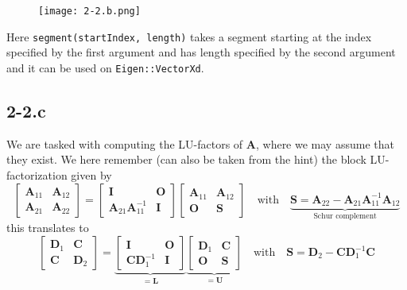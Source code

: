 \documentclass{article}
\begin{document}
\begin{figure}[!hbt]
    \centering
\texttt{[image: 2-2.b.png]}
\end{figure}

\noindent Here \verb|segment(startIndex, length)| takes a segment starting at the index specified by the first argument and has length specified by the second argument and it can be used on \verb|Eigen::VectorXd|.

\subsection*{2-2.c}
We are tasked with computing the LU-factors of $\mathbf{A}$, where we may assume that they exist. We here remember (can also be taken from the hint) the block LU-factorization given by
\begin{equation*}
    \begin{bmatrix}
        \mathbf{A}_{11} & \mathbf{A}_{12} \\
        \mathbf{A}_{21} & 
        \mathbf{A}_{22}
    \end{bmatrix}
    = \begin{bmatrix}
        \mathbf{I} & \mathbf{O} \\
        \mathbf{A}_{21}\mathbf{A}_{11}^{-1} & \mathbf{I}
    \end{bmatrix}
    \begin{bmatrix}
        \mathbf{A}_{11} & \mathbf{A}_{12} \\
        \mathbf{O} & \mathbf{S}
    \end{bmatrix}
    \quad \text{with} \quad \underbrace{\mathbf{S} = \mathbf{A}_{22}-\mathbf{A}_{21}\mathbf{A}_{11}^{-1}\mathbf{A}_{12}}_{\text{Schur complement}}
\end{equation*}
this translates to 
\begin{equation*}
    \begin{bmatrix}
        \mathbf{D}_{1} & \mathbf{C} \\
        \mathbf{C} & 
        \mathbf{D}_{2}
    \end{bmatrix}
    = \underbrace{\begin{bmatrix}
        \mathbf{I} & \mathbf{O} \\
        \mathbf{C}\mathbf{D}_{1}^{-1} & \mathbf{I}
\end{bmatrix}}_{=\mathbf{L}}
    \underbrace{\begin{bmatrix}
        \mathbf{D}_{1} & \mathbf{C} \\
        \mathbf{O} & \mathbf{S}
    \end{bmatrix}}_{=\mathbf{U}}
    \quad \text{with} \quad \mathbf{S} = \mathbf{D}_{2}-\mathbf{C}\mathbf{D}_{1}^{-1}\mathbf{C}
\end{equation*}
\end{document}
